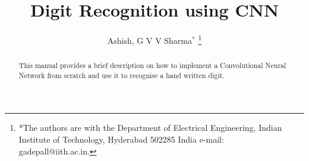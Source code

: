 \documentclass[journal,12pt,twocolumn]{IEEEtran}
\begin{document}


\let\StandardTheFigure\thefigure
\let\StandardTheTable\thetable





\def\putbox#1#2#3{\makebox[0in][l]{\makebox[#1][l]{}\raisebox{\baselineskip}[0in][0in]{\raisebox{#2}[0in][0in]{#3}}}}
     \def\rightbox#1{\makebox[0in][r]{#1}}
     \def\centbox#1{\makebox[0in]{#1}}
     \def\topbox#1{\raisebox{-\baselineskip}[0in][0in]{#1}}
     \def\midbox#1{\raisebox{-0.5\baselineskip}[0in][0in]{#1}}



\title{ 
Digit Recognition using CNN
}



\author{Ashish, G V V 
Sharma$^{*}$%
\thanks{*The authors are with the Department
of Electrical Engineering, Indian Institute of Technology, Hyderabad
502285 India e-mail:  gadepall@iith.ac.in.}
}


\maketitle

\tableofcontents

\bigskip
%
\begin{abstract}
This manual provides a brief description on how to implement a Convolutional Neural Network from scratch and use it to recognise a hand written digit.
\end{abstract}

%
\end{document}

